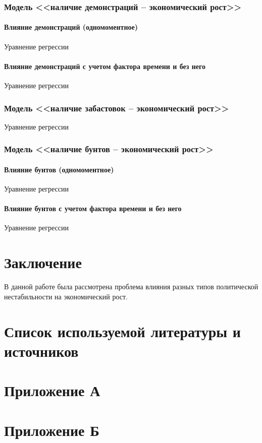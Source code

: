 \documentclass[14pt]{extarticle} %
\begin{document}
\subsubsection{Модель <<наличие демонстраций – экономический рост>>}
\paragraph{Влияние демонстраций (одномоментное)} Уравнение регрессии
\paragraph{Влияние демонстраций с учетом фактора времени и без него} Уравнение регрессии
\subsubsection{Модель <<наличие забастовок – экономический рост>>} Уравнение регрессии
\subsubsection{Модель <<наличие бунтов – экономический рост>>} 
\paragraph{Влияние бунтов (одномоментное)} Уравнение регрессии
\paragraph{Влияние бунтов с учетом фактора времени и без него} Уравнение регрессии 
\newpage
\section*{Заключение}
В данной работе была рассмотрена проблема влияния разных типов политической нестабильности на экономический рост. 
\newpage
\section*{Список используемой литературы и источников}
\newpage
{} \newpage
{}
\section*{Приложение А}
\section*{Приложение Б}
\end{document}
